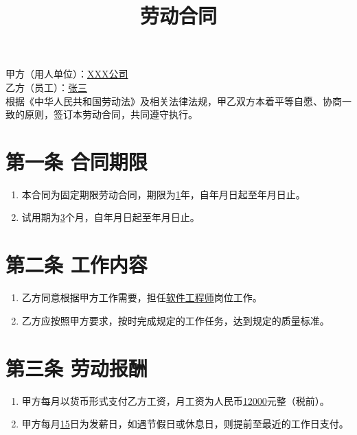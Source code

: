 \documentclass[UTF8]{ctexart}
\title{劳动合同}
\date{}
\author{}
\begin{document}
\maketitle

\noindent 甲方（用人单位）：\underline{XXX公司} \\
乙方（员工）：\underline{张三} \\

根据《中华人民共和国劳动法》及相关法律法规，甲乙双方本着平等自愿、协商一致的原则，签订本劳动合同，共同遵守执行。

\section*{第一条 合同期限}
\begin{enumerate}
    \item 本合同为固定期限劳动合同，期限为\underline{1}年，自\underline{\hspace{2cm}}年\underline{\hspace{1cm}}月\underline{\hspace{1cm}}日起至\underline{\hspace{2cm}}年\underline{\hspace{1cm}}月\underline{\hspace{1cm}}日止。
    \item 试用期为\underline{3}个月，自\underline{\hspace{2cm}}年\underline{\hspace{1cm}}月\underline{\hspace{1cm}}日起至\underline{\hspace{2cm}}年\underline{\hspace{1cm}}月\underline{\hspace{1cm}}日止。
\end{enumerate}

\section*{第二条 工作内容}
\begin{enumerate}
    \item 乙方同意根据甲方工作需要，担任\underline{软件工程师}岗位工作。
    \item 乙方应按照甲方要求，按时完成规定的工作任务，达到规定的质量标准。
\end{enumerate}

\section*{第三条 劳动报酬}
\begin{enumerate}
    \item 甲方每月以货币形式支付乙方工资，月工资为人民币\underline{12000}元整（税前）。
    \item 甲方每月\underline{15}日为发薪日，如遇节假日或休息日，则提前至最近的工作日支付。
\end{enumerate}
\end{document}
